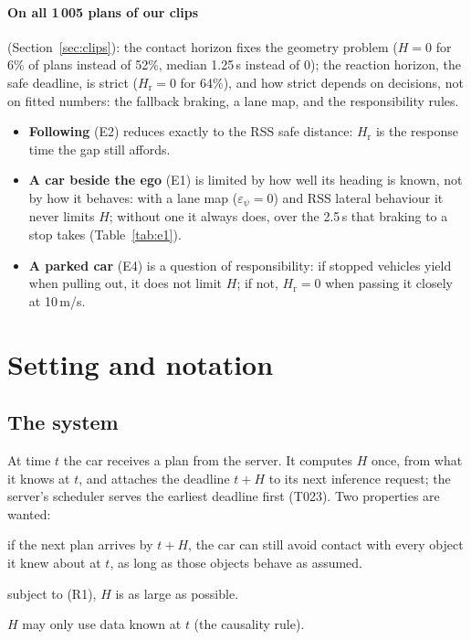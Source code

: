 \documentclass[11pt]{article}
\theoremstyle{definition}
\theoremstyle{remark}
\newcommand{\Hr}{H_{\mathrm{r}}}
\begin{document}
\paragraph{On all 1\,005 plans of our clips} (Section~\ref{sec:clips}): the contact horizon fixes the
geometry problem ($H=0$ for 6\% of plans instead of 52\%, median 1.25\,s instead of 0); the reaction
horizon, the safe deadline, is strict ($\Hr=0$ for 64\%), and how strict depends on decisions, not on
fitted numbers: the fallback braking, a lane map, and the responsibility rules.

\begin{itemize}[leftmargin=*]
  \item \textbf{Following} (E2) reduces exactly to the RSS safe distance: $\Hr$ is the response time the
    gap still affords.
  \item \textbf{A car beside the ego} (E1) is limited by how well its heading is known, not by how it
    behaves: with a lane map ($\varepsilon_\psi=0$) and RSS lateral behaviour it never limits $H$; without
    one it always does, over the 2.5\,s that braking to a stop takes (Table~\ref{tab:e1}).
  \item \textbf{A parked car} (E4) is a question of responsibility: if stopped vehicles yield when pulling
    out, it does not limit $H$; if not, $\Hr=0$ when passing it closely at 10\,m/s.
\end{itemize}

\section{Setting and notation}\label{sec:setting}

\subsection{The system}
At time $t$ the car receives a plan from the server. It computes $H$ once, from what it knows at $t$,
and attaches the deadline $t+H$ to its next inference request; the server's scheduler serves the
earliest deadline first (T023). Two properties are wanted:
\begin{description}[leftmargin=*]
  \item[(R1) Safe:] if the next plan arrives by $t+H$, the car can still avoid contact with every object
    it knew about at $t$, as long as those objects behave as assumed.
  \item[(R2) Useful:] subject to (R1), $H$ is as large as possible.
\end{description}
$H$ may only use data known at $t$ (the causality rule).
\end{document}
